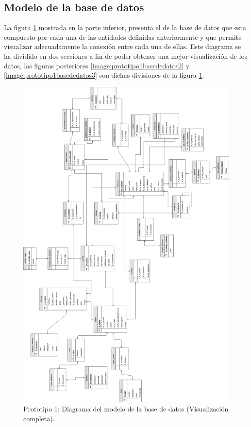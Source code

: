 \subsection{Modelo de la base de datos}
La figura \ref{image:prototipo1basededatos1} mostrada en la parte inferior, presenta el  de la base de datos que esta compuesto por cada una de las entidades definidas anteriormente y que permite visualizar adecuadamente la conexión entre cada una de ellas.
Este diagrama se ha dividido en dos secciones a fin de poder obtener una mejor visualización de los datos, las figuras posteriores \ref{image:prototipo1basededatos2} y \ref{image:prototipo1basededatos3} son dichas divisiones de la figura \ref{image:prototipo1basededatos1}.
\label{Modelo-BD}
\FloatBarrier
\begin{figure}[htbp!]
		\centering
			\includegraphics[width=.9 \textwidth]{images/TT_database_1}
		\caption{Prototipo 1: Diagrama del modelo de la base de datos (Visualización completa).}
		\label{image:prototipo1basededatos1}
\end{figure}
\FloatBarrier

